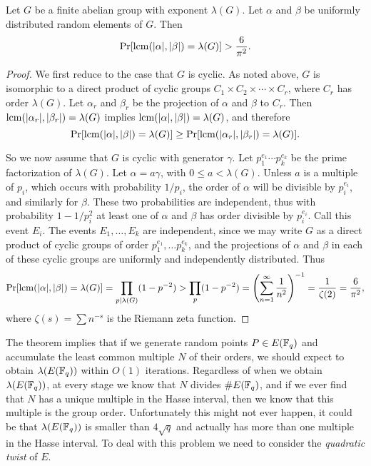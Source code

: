 \begin{thm}\label{thm:exponent}
Let $G$ be a finite abelian group with exponent $\lambda(G)$.  Let $\alpha$ and $\beta$ be uniformly distributed random elements of $G$.
Then
\[
\Pr[\operatorname{lcm}(|\alpha|,|\beta|) = \lambda(G)] > \frac{6}{\pi^2}.
\]
\end{thm}
\begin{proof}
We first reduce to the case that $G$ is cyclic.
As noted above, $G$ is isomorphic to a direct product of cyclic groups $C_1\times C_2\times \cdots\times C_r$, where $C_r$ has order $\lambda(G)$.
Let $\alpha_r$ and $\beta_r$ be the projection of $\alpha$ and $\beta$ to $C_r$.
Then $\operatorname{lcm}(|\alpha_r|,|\beta_r|)=\lambda(G)$ implies $\operatorname{lcm}(|\alpha|,|\beta|)=\lambda(G)$, and therefore
\[
\Pr[\operatorname{lcm}(|\alpha|,|\beta|) = \lambda(G)] \ge \Pr[\operatorname{lcm}(|\alpha_r|,|\beta_r|) = \lambda(G)] .
\]

So we now assume that $G$ is cyclic with generator $\gamma$.  Let $p_1^{e_1}\cdots p_k^{e_k}$ be the prime factorization of $\lambda(G)$.
Let $\alpha=a\gamma$, with $0\le a <  \lambda(G)$.  Unless $a$ is a multiple of $p_i$, which occurs with probability $1/p_i$,
the order of $\alpha$ will be divisible by $p_i^{e_i}$, and similarly for $\beta$.  These two probabilities are independent, thus with probability $1-1/p_i^2$ at least one of $\alpha$ and $\beta$ has order divisible by $p_i^{e_i}$.   Call this event $E_i$.
The events $E_1,\ldots, E_k$ are independent, since we may write $G$ as a direct product of cyclic groups of order $p_1^{e_1},\ldots p_k^{e_k}$, and the projections of $\alpha$ and $\beta$ in each of these cyclic groups are uniformly and independently distributed.  Thus
\[
\Pr[\operatorname{lcm}(|\alpha|,|\beta|)=\lambda(G)] = \prod_{p|\lambda(G)}( 1-p^{-2}) >\prod_p (1-p^{-2})= \left(\sum_{n=1}^\infty\frac{1}{n^2}\right)^{-1} = \frac{1}{\zeta(2)} = \frac{6}{\pi^2},
\]
where $\zeta(s)=\sum n^{-s}$ is the Riemann zeta function.
\end{proof}

The theorem implies that if we generate random points $P\in E(\mathbb{F}_q)$ and accumulate the least common multiple $N$ of their orders, we should expect to obtain $\lambda(E(\mathbb{F}_q))$ within $O(1)$ iterations.
Regardless of when we obtain $\lambda(E(\mathbb{F}_q))$, at every stage we know that $N$ divides $\#E(\mathbb{F}_q)$, and if we ever find that $N$ has a unique multiple in the Hasse interval, then we know that this multiple is the group order.
Unfortunately this might not ever happen, it could be that $\lambda(E(\mathbb{F}_q))$ is smaller than $4\sqrt{q}$ and actually has more than one multiple in the Hasse interval.
To deal with this problem we need to consider the \emph{quadratic twist} of $E$.

